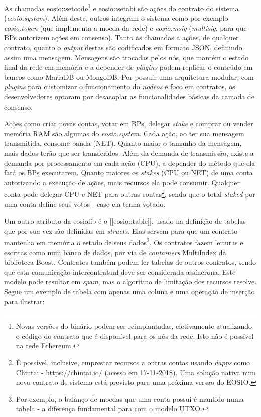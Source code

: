 \documentclass[a4paper,12pt]{monografia}
\theoremstyle{plain}
\theoremstyle{definition}
\theoremstyle{remark}
\begin{document}
As chamadas eosio::setcode\footnote{Novas vers\~oes do bin\'ario podem ser reimplantadas, efetivamente atualizando o c\'odigo do contrato que \'e dispon\'ivel para os n\'os da rede. Isto n\~ao \'e poss\'ivel na rede Ethereum.} e eosio::setabi s\~ao a\c{c}\~oes do contrato do sistema (\textit{eosio.system}).
Al\'em deste, outros integram o sistema como por exemplo \textit{eosio.token} (que implementa a moeda da rede) e \textit{eosio.msig} (\textit{multisig}, para que BPs autorizem a\c{c}\~oes em consenso).
Tanto as chamadas a a\c{c}\~oes, de qualquer contrato, quanto o \textit{output} destas s\~ao codificados em formato JSON, definindo assim uma mensagem.
Mensagens s\~ao trocadas pelos n\'os, que mant\'em o estado final da rede em mem\'oria e a depender de \textit{plugins} podem replicar o conte\'udo em bancos como MariaDB ou MongoDB.
Por possuir uma arquitetura modular, com \textit{plugins} para customizar o funcionamento do \textit{nodeos} e foco em contratos, os desenvolvedores optaram por desacoplar as funcionalidades b\'asicas da camada de consenso.

A\c{c}\~oes como criar novas contas, votar em BPs, delegar \textit{stake} e comprar ou vender mem\'oria RAM s\~ao algumas do \textit{eosio.system}.
Cada a\c{c}\~ao, ao ter sua mensagem transmitida, consome banda (NET). Quanto maior o tamanho da mensagem, mais dados ter\~ao que ser transferidos.
Al\'em da demanda de transmiss\~ao, existe a demanda por processamento em cada a\c{c}\~ao (CPU), a depender do m\'etodo que ela far\'a os BPs executarem.
Quanto maiores os \textit{stakes} (CPU ou NET) de uma conta autorizando a execu\c{c}\~ao de a\c{c}\~oes, mais recursos ela pode consumir.
Qualquer conta pode delegar CPU e NET para outras contas\footnote{\'E poss\'ivel, inclusive, emprestar recursos a outras contas usando \textit{dapps} como Chintai - \url{https://chintai.io/} (acesso em 17-11-2018). Uma solu\c{c}\~ao nativa num novo contrato de sistema est\'a previsto para uma pr\'oxima versao do EOSIO.}, sendo que o total \textit{staked} por uma conta define seus votos - caso ela tenha votado.

Um outro atributo da eosiolib \'e o [[eosio::table]], usado na defini\c{c}\~ao de tabelas que por sua vez s\~ao definidas em \textit{structs}.
Elas servem para que um contrato mantenha em mem\'oria o estado de seus dados\footnote{Por exemplo, o balan\c{c}o de moedas que uma conta possui \'e mantido numa tabela - a diferen\c{c}a fundamental para com o modelo UTXO.}.
Os contratos fazem leituras e escritas como num banco de dados, por via de \textit{containers} MultiIndex da biblioteca Boost.
Contratos tamb\'em podem ler tabelas de outros contratos, sendo que esta comunica\c{c}\~ao intercontratual deve ser considerada ass\'incrona.
Este modelo pode resultar em \textit{spam}, mas o algoritmo de limita\c{c}\~ao dos recursos resolve.
Segue um exemplo de tabela com apenas uma coluna e uma opera\c{c}\~ao de inser\c{c}\~ao para ilustrar:
\end{document}
